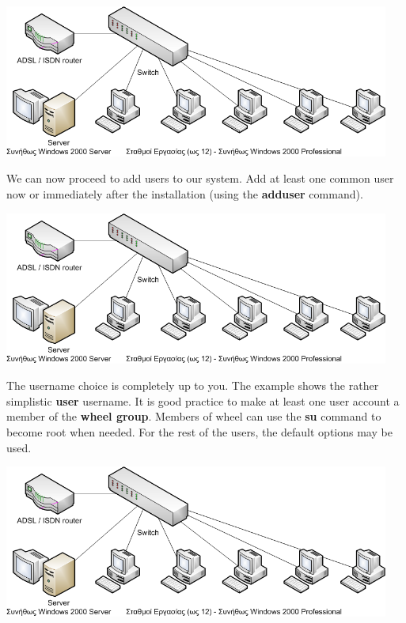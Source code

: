 \documentclass[a4paper,twoside,12pt]{article}
\begin{document}
\begin{center}
\includegraphics[width=0.95\textwidth]{images/main/school-lab}
\end{center}

We can now proceed to add users to our system. Add at least one common user now or immediately after the installation (using the \textbf{adduser} command).

\begin{center}
\includegraphics[width=0.95\textwidth]{images/main/school-lab}
\end{center}

The username choice is completely up to you. The example shows the rather simplistic \textbf{user} username. It is good practice to make at least one user account a member of the \textbf{wheel group}. Members of wheel can use the \textbf{su} command to become root when needed. For the rest of the users, the default options may be used.

\begin{center}
\includegraphics[width=0.95\textwidth]{images/main/school-lab}
\end{center}
\end{document}
